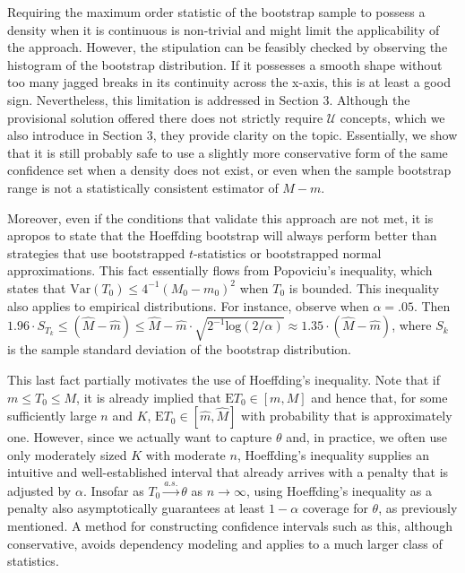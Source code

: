 \documentclass[12pt]{amsart}
\theoremstyle{plain}%
\theoremstyle{definition}
\theoremstyle{remark}
\numberwithin{equation}{section}
\begin{document}
Requiring the maximum order statistic of the bootstrap sample to possess a density when it is continuous is non-trivial and might limit the applicability of the approach. However, the stipulation can be feasibly checked by observing the histogram of the bootstrap distribution. If it possesses a smooth shape without too many jagged breaks in its continuity across the x-axis, this is at least a good sign. Nevertheless, this limitation is addressed in Section 3. Although the provisional solution offered there does not strictly require $\mathcal{U}$ concepts, which we also introduce in Section 3, they provide clarity on the topic. Essentially, we show that it is still probably safe to use a slightly more conservative form of the same confidence set when a density does not exist, or even when the sample bootstrap range is not a statistically consistent estimator of $M-m$.

Moreover, even if the conditions that validate this approach are not met, it is apropos to state that the Hoeffding bootstrap will always perform better than strategies that use bootstrapped $t$-statistics or bootstrapped normal approximations. This fact essentially flows from Popoviciu's inequality, which states that $\text{Var}(T_0) \leq 4^{-1}(M_0 - m_0)^2$ when $T_0$ is bounded. This inequality also applies to empirical distributions. For instance, observe when $\alpha = .05$. Then $1.96 \cdot S_{T_k} \leq (\hat{M} - \hat{m}) \leq \hat{M} - \hat{m} \cdot \sqrt{2^{-1}\text{log}(2/\alpha)} \approx 1.35 \cdot (\hat{M} - \hat{m})$, where $S_k$ is the sample standard deviation of the bootstrap distribution.

This last fact partially motivates the use of Hoeffding's inequality. Note that if $m \leq T_0 \leq M$, it is already implied that $\text{E}T_0 \in [m, M]$ and hence that, for some sufficiently large $n$ and $K$, $\text{E}T_0 \in [\hat{m}, \hat{M}]$ with probability that is approximately one. However, since we actually want to capture $\theta$ and, in practice, we often use only moderately sized $K$ with moderate $n$, Hoeffding's inequality supplies an intuitive and well-established interval that already arrives with a penalty that is adjusted by $\alpha$. Insofar as $T_0 \overset{a.s.}{\to} \theta$ as $n \to \infty$, using Hoeffding's inequality as a penalty also asymptotically guarantees at least $1-\alpha$ coverage for $\theta$, as previously mentioned. A method for constructing confidence intervals such as this, although conservative, avoids dependency modeling and applies to a much larger class of statistics.
\end{document}
